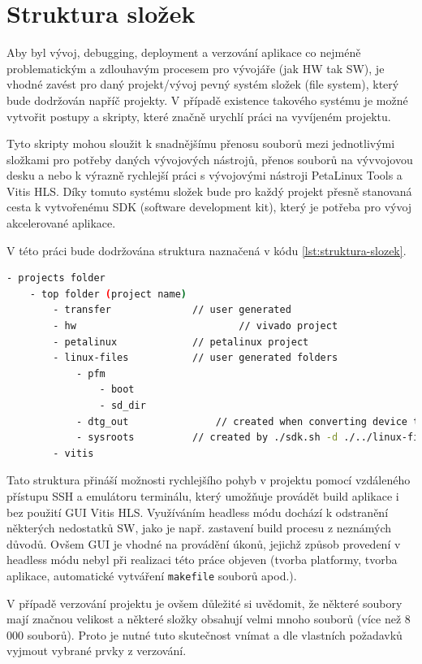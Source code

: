 \documentclass[a4paper, twoside, 11pt]{article}
\begin{document}
	\section{Struktura složek}\label{sec:struktura-slozek}
		Aby byl vývoj, debugging, deployment a verzování aplikace co nejméně problematickým a zdlouhavým procesem pro vývojáře (jak HW tak SW), je vhodné zavést pro daný projekt/vývoj pevný systém složek (file system), který bude dodržován napříč projekty. V případě existence takového systému je možné vytvořit postupy a skripty, které značně urychlí práci na vyvíjeném projektu.\par
		Tyto skripty mohou sloužit k snadnějšímu přenosu souborů mezi jednotlivými složkami pro potřeby daných vývojových nástrojů, přenos souborů na vývvojovou desku a nebo k výrazně rychlejší práci s vývojovými nástroji PetaLinux Tools a Vitis HLS. Díky tomuto systému složek bude pro každý projekt přesně stanovaná cesta k vytvořenému SDK (software development kit), který je potřeba pro vývoj akcelerované aplikace.\par
		V této práci bude dodržována struktura naznačená v kódu \ref{lst:struktura-slozek}.

		\begin{lstlisting}[language={sh}, caption={Struktura složek, využívaná při tvorbě projektů k dosažení lepšího DX.}, label= {lst:struktura-slozek}]
- projects folder
	- top folder (project name)
		- transfer				// user generated
		- hw							// vivado project
		- petalinux				// petalinux project
		- linux-files			// user generated folders
			- pfm
				- boot
				- sd_dir
			- dtg_out				// created when converting device tree from XSA file
			- sysroots			// created by ./sdk.sh -d ./../linux-files
		- vitis\end{lstlisting}

		Tato struktura přináší možnosti rychlejšího pohyb v projektu pomocí vzdáleného přístupu SSH a emulátoru terminálu, který umožňuje provádět build aplikace i bez použití GUI Vitis HLS. Využíváním headless módu dochází k odstranění některých nedostatků SW, jako je např. zastavení build procesu z neznámých důvodů. Ovšem GUI je vhodné na provádění úkonů, jejichž způsob provedení v headless módu nebyl při realizaci této práce objeven (tvorba platformy, tvorba aplikace, automatické vytváření \texttt{makefile} souborů apod.).\par
		V případě verzování projektu je ovšem důležité si uvědomit, že některé soubory mají značnou velikost a některé složky obsahují velmi mnoho souborů (více než 8 000 souborů). Proto je nutné tuto skutečnost vnímat a dle vlastních požadavků vyjmout vybrané prvky z verzování.
		
\end{document}
